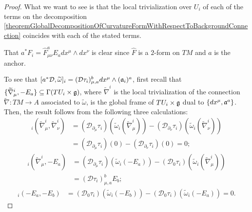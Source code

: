 \begin{proof}
What we want to see is that the local trivialization over $U_i$ of each of the terms on the decomposition \ref{theoremGlobalDecompositionOfCurvatureFormWithRespectToBackgroundConnection} coincides with each of the stated terms.

That $a^*F_i = \hat F^a_{\mu \nu} E_a dx^\mu \wedge dx^\nu$ is clear since $\hat F$ is a $2$-form on $TM$ and $a$ is the anchor.

To see that $[a^* \mathcal D, \widetilde \omega]_i = (\mathcal D \tau_i)^b_{\mu, a} dx^\mu \wedge (\mathfrak{a}_i)^a$, first recall that $\{\widetilde \nabla^i_\mu, -E_a\} \subseteq \Gamma(TU_i \times \mathfrak{g})$, where $\tilde \nabla^i$ is the local trivialization of the connection $\tilde \nabla:TM \to A$ associated to $\tilde \omega$, is the global frame of $TU_i \times \mathfrak{g}$ dual to $\{dx^\mu, \mathfrak{a}^a\}$. Then, the result follows from the following three calculations:
\begin{align*}
    [a^* \mathcal D, \tilde \omega]_i(\tilde \nabla^i_\mu, \tilde \nabla^i_\nu) 
        &= (\mathcal D_{\partial_\mu} \tau_i) (\tilde \omega_i(\tilde \nabla^i_\mu)) - (\mathcal D_{\partial_\nu} \tau_i) (\tilde \omega_i(\tilde \nabla^i_\nu))\\
        &= (\mathcal D_{\partial_\mu} \tau_i) (0) - (\mathcal D_{\partial_\nu} \tau_i)(0) = 0;
\end{align*}
\begin{align*}
    [a^* \mathcal D, \tilde \omega]_i(\tilde \nabla^i_\mu, -E_a) 
        &= (\mathcal D_{\partial_\mu} \tau_i) (\tilde \omega_i(-E_a)) - (\mathcal D_{0} \tau_i) (\tilde \omega_i(\tilde \nabla^i_\mu))\\
        &= (\mathcal D \tau_i)^b_{\mu, a} E_b;
\end{align*}
\begin{align*}
    [a^* \mathcal D, \tilde \omega]_i(-E_a, -E_b) 
        &= (\mathcal D_{0} \tau_i) (\tilde \omega_i(-E_b)) - (\mathcal D_{0} \tau_i) (\tilde \omega_i(-E_a)) = 0.
\end{align*}


\end{proof}

